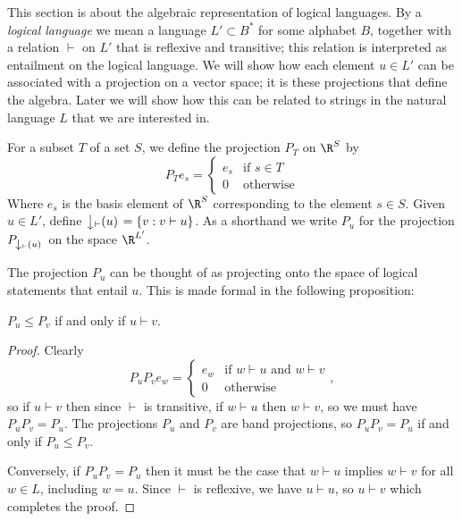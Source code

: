 This section is about the algebraic representation of logical languages. By a \emph{logical language} we mean a language $L' \subset B^*$ for some alphabet $B$, together with a relation $\vdash$ on $L'$ that is reflexive and transitive; this relation is interpreted as entailment on the logical language. We will show how each element $u \in L'$ can be associated with a projection on a vector space; it is these projections that define the algebra. Later we will show how this can be related to strings in the natural language $L$ that we are interested in.

For a subset $T$ of a set $S$, we define the projection $P_T$ on $\R^S$ by 
$$P_T e_s = \left\{
\begin{array}{ll}
e_s & \text{if $s \in T$}\\
0 & \text{otherwise}
\end{array}
 \right.$$
 Where $e_s$ is the basis element of $\R^S$ corresponding to the element $s\in S$.
Given $u \in L'$, define $\left\downarrow_\vdash(u)\right. = \{v : v \vdash u\}$. As a shorthand we write $P_u$ for the projection $P_{\left\downarrow_\vdash(u)\right.}$ on the space $\R^{L'}$.

The projection $P_u$ can be thought of as projecting onto the space of logical statements that entail $u$. This is made formal in the following proposition:
\begin{prop}\label{modelth}
$P_u \le P_v$ if and only if $u \vdash v$.
\end{prop}
\begin{proof}
Clearly
\begin{equation}
\tag{$*$}\label{projectionprod}
P_uP_v e_w = \left\{
\begin{array}{ll}
e_w & \text{if $w \vdash u$ and $w \vdash v$}\\
0 & \text{otherwise}
\end{array},
 \right.
 \end{equation}
so if $u \vdash v$ then since $\vdash$ is transitive, if $w \vdash u$ then $w \vdash v$, so we must have $P_uP_v = P_u$. The projections $P_u$ and $P_v$ are band projections, so $P_uP_v = P_u$ if and only if $P_u \le P_v$.

Conversely, if $P_uP_v = P_u$ then it must be the case that $w \vdash u$ implies $w \vdash v$ for all $w \in L$, including $w = u$. Since $\vdash$ is reflexive, we have $u \vdash u$, so $u \vdash v$ which completes the proof.
\end{proof}

